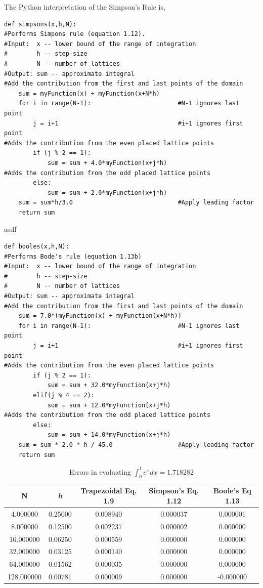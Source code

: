 \documentclass[10pt]{article}
\begin{document}
The Python interpretation of the Simpson's Rule is,
\begin{lstlisting}   
def simpsons(x,h,N):
#Performs Simpons rule (equation 1.12).
#Input:  x -- lower bound of the range of integration
#        h -- step-size
#        N -- number of lattices
#Output: sum -- approximate integral
#Add the contribution from the first and last points of the domain
    sum = myFunction(x) + myFunction(x+N*h)
    for i in range(N-1):						#N-1 ignores last point
        j = i+1        						    #i+1 ignores first point
#Adds the contribution from the even placed lattice points        
        if (j % 2 == 1):
            sum = sum + 4.0*myFunction(x+j*h)
#Adds the contribution from the odd placed lattice points            
        else:
            sum = sum + 2.0*myFunction(x+j*h)                    
    sum = sum*h/3.0                             #Apply leading factor
    return sum
\end{lstlisting}
asdf
\begin{lstlisting}
def booles(x,h,N):
#Performs Bode's rule (equation 1.13b)
#Input:  x -- lower bound of the range of integration
#        h -- step-size
#        N -- number of lattices
#Output: sum -- approximate integral 
#Add the contribution from the first and last points of the domain
    sum = 7.0*(myFunction(x) + myFunction(x+N*h))
    for i in range(N-1):						#N-1 ignores last point
        j = i+1        						    #i+1 ignores first point
#Adds the contribution from the even placed lattice points        
        if (j % 2 == 1):
            sum = sum + 32.0*myFunction(x+j*h)
        elif(j % 4 == 2):
            sum = sum + 12.0*myFunction(x+j*h)
#Adds the contribution from the odd placed lattice points            
        else:
            sum = sum + 14.0*myFunction(x+j*h)                    
    sum = sum * 2.0 * h / 45.0                  #Apply leading factor
    return sum
\end{lstlisting}

\begin{table}[!ht]
	\begin{center}
	\caption{Errors in evaluating $\int^1_0 e^x dx = 1.718282$ }
		\label{tab:quad_errors}
		\begin{tabular}{|ccccc|}
		\hline
		N & \textit{h} & Trapezoidal Eq. 1.9 & Simpson's Eq. 1.12 & Boole's Eq 1.13 \\
		\hline
		4.000000&0.25000&0.008940&0.000037&0.000001\\ 
		8.000000&0.12500&0.002237&0.000002&0.000000\\ 
		16.000000&0.06250&0.000559&0.000000&0.000000\\ 
		32.000000&0.03125&0.000140&0.000000&0.000000\\ 
		64.000000&0.01562&0.000035&0.000000&0.000000\\ 
		128.000000&0.00781&0.000009&0.000000&-0.000000\\ 
		\hline
		\end{tabular}
	\end{center}
\end{table}
\end{document}
